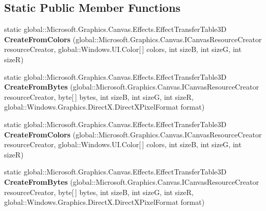 \subsection*{Static Public Member Functions}
\begin{DoxyCompactItemize}
\item 
\mbox{\label{class_microsoft_1_1_graphics_1_1_canvas_1_1_effects_1_1_effect_transfer_table3_d_a9057219ec2949dd662066c70f1a5432e}} 
static global\+::\+Microsoft.\+Graphics.\+Canvas.\+Effects.\+Effect\+Transfer\+Table3D {\bfseries Create\+From\+Colors} (global\+::\+Microsoft.\+Graphics.\+Canvas.\+I\+Canvas\+Resource\+Creator resource\+Creator, global\+::\+Windows.\+U\+I.\+Color\mbox{[}$\,$\mbox{]} colors, int sizeB, int sizeG, int sizeR)
\item 
\mbox{\label{class_microsoft_1_1_graphics_1_1_canvas_1_1_effects_1_1_effect_transfer_table3_d_a710783796df3cf65dfda645371d857cb}} 
static global\+::\+Microsoft.\+Graphics.\+Canvas.\+Effects.\+Effect\+Transfer\+Table3D {\bfseries Create\+From\+Bytes} (global\+::\+Microsoft.\+Graphics.\+Canvas.\+I\+Canvas\+Resource\+Creator resource\+Creator, byte\mbox{[}$\,$\mbox{]} bytes, int sizeB, int sizeG, int sizeR, global\+::\+Windows.\+Graphics.\+Direct\+X.\+Direct\+X\+Pixel\+Format format)
\item 
\mbox{\label{class_microsoft_1_1_graphics_1_1_canvas_1_1_effects_1_1_effect_transfer_table3_d_a9057219ec2949dd662066c70f1a5432e}} 
static global\+::\+Microsoft.\+Graphics.\+Canvas.\+Effects.\+Effect\+Transfer\+Table3D {\bfseries Create\+From\+Colors} (global\+::\+Microsoft.\+Graphics.\+Canvas.\+I\+Canvas\+Resource\+Creator resource\+Creator, global\+::\+Windows.\+U\+I.\+Color\mbox{[}$\,$\mbox{]} colors, int sizeB, int sizeG, int sizeR)
\item 
\mbox{\label{class_microsoft_1_1_graphics_1_1_canvas_1_1_effects_1_1_effect_transfer_table3_d_a710783796df3cf65dfda645371d857cb}} 
static global\+::\+Microsoft.\+Graphics.\+Canvas.\+Effects.\+Effect\+Transfer\+Table3D {\bfseries Create\+From\+Bytes} (global\+::\+Microsoft.\+Graphics.\+Canvas.\+I\+Canvas\+Resource\+Creator resource\+Creator, byte\mbox{[}$\,$\mbox{]} bytes, int sizeB, int sizeG, int sizeR, global\+::\+Windows.\+Graphics.\+Direct\+X.\+Direct\+X\+Pixel\+Format format)

\end{DoxyCompactItemize}
